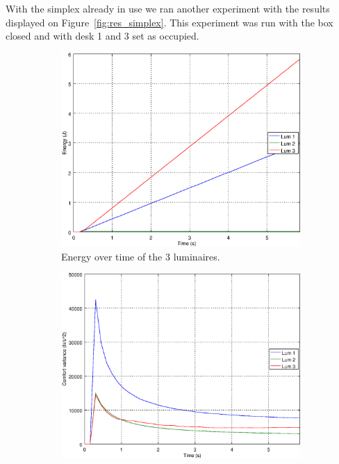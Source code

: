 With the simplex already in use we ran another experiment with the results displayed on Figure~\ref{fig:res_simplex}. This experiment was run with the box closed and with desk 1 and 3 set as occupied.

\begin{figure}[ht]
    \centering
    \begin{subfigure}[t]{0.32\textwidth}
    \centering
    \includegraphics[width=.95\textwidth]{img/e_}
    \caption{Energy over time of the 3 luminaires.}
    \label{fig:e_}
    \end{subfigure}
    \begin{subfigure}[t]{0.32\textwidth}
    \centering
    \includegraphics[width=.95\textwidth]{img/f_}

\end{subfigure}
\end{figure}
